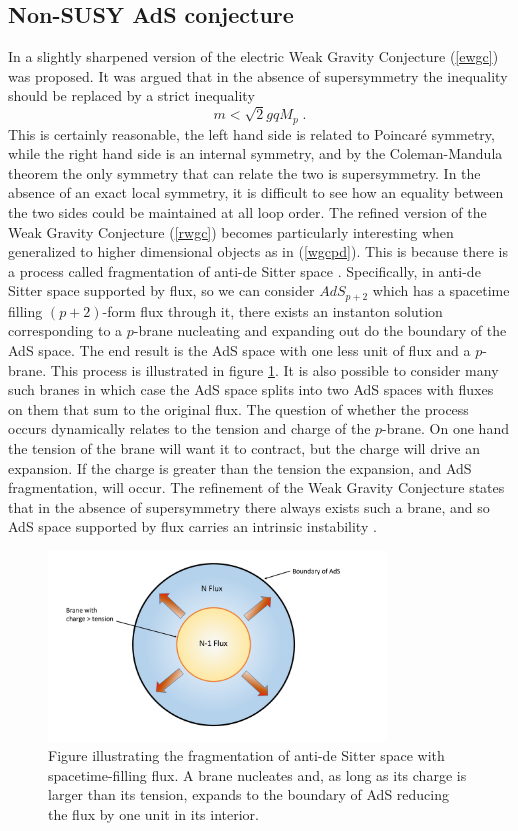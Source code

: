 \documentclass[11pt,a4paper]{article}
\numberwithin{equation}{section}
\numberwithin{table}{section}\setlength{\multlinegap}{25pt}
\newcommand{\be}{\begin{equation}}
\newcommand{\ee}{\end{equation}}
\begin{document}
{\subsection{Non-SUSY AdS conjecture}

In \cite{Ooguri:2017njy} a slightly sharpened version of the electric Weak Gravity Conjecture (\ref{ewgc}) was proposed. It was argued that in the absence of supersymmetry the inequality should be replaced by a strict inequality
\be
m < \sqrt{2} g q M_p \;.
\label{rwgc}
\ee
This is certainly reasonable, the left hand side is related to Poincar\'e symmetry, while the right hand side is an internal symmetry, and by the Coleman-Mandula theorem the only symmetry that can relate the two is supersymmetry. In the absence of an exact local symmetry, it is difficult to see how an equality between the two sides could be maintained at all loop order. The refined version of the Weak Gravity Conjecture (\ref{rwgc}) becomes particularly interesting when generalized to higher dimensional objects as in (\ref{wgcpd}). This is because there is a process called fragmentation of anti-de Sitter space \cite{Maldacena:1998uz}. Specifically, in anti-de Sitter space supported by flux, so we can consider $AdS_{p+2}$ which has a spacetime filling $\left(p+2\right)$-form flux through it, there exists an instanton solution corresponding to a $p$-brane nucleating and expanding out do the boundary of the AdS space. The end result is the AdS space with one less unit of flux and a $p$-brane. This process is illustrated in figure \ref{fig:adsfrag}. It is also possible to consider many such branes in which case the AdS space splits into two AdS spaces with fluxes on them that sum to the original flux. The question of whether the process occurs dynamically relates to the tension and charge of the $p$-brane. On one hand the tension of the brane will want it to contract, but the charge will drive an expansion. If the charge is greater than the tension the expansion, and AdS fragmentation, will occur. The refinement of the Weak Gravity Conjecture states that in the absence of supersymmetry there always exists such a brane, and so AdS space supported by flux carries an intrinsic instability \cite{Ooguri:2017njy}. 
\begin{figure}[t]
\centering
 \includegraphics[width=0.8\textwidth]{fragads.pdf}
\caption{Figure illustrating the fragmentation of anti-de Sitter space with spacetime-filling flux. A brane nucleates and, as long as its charge is larger than its tension, expands to the boundary of AdS reducing the flux by one unit in its interior.}
\label{fig:adsfrag}
\end{figure}

}
\end{document}
